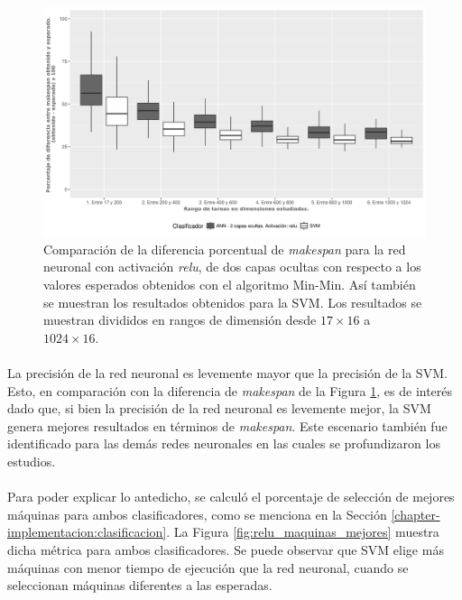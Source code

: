 \begin{figure}[H]
  \centering
  \includegraphics[width=\columnwidth]{imagenes/relu/2_medianas_diferenciasann_2_capas_ocultas_relu.png}
  \caption{Comparación de la diferencia porcentual de \textit{makespan} para la red neuronal con activación \textit{relu}, de dos capas ocultas con respecto a los valores esperados obtenidos con el algoritmo Min-Min.
Así también se muestran los resultados obtenidos para la SVM.
Los resultados se muestran divididos en rangos de dimensión desde $ 17 \times 16$ a $ 1024 \times 16$.}
  \label{fig:relu_makespan}
\end{figure}

\paragraph{}La precisión de la red neuronal es levemente mayor que la precisión de la SVM.
Esto, en comparación con la diferencia de \textit{makespan} de la Figura \ref{fig:relu_makespan}, es de interés dado que, si bien la precisión de la red neuronal es levemente mejor, la SVM genera mejores resultados en términos de \textit{makespan}.
Este escenario también fue identificado para las demás redes neuronales en las cuales se profundizaron los estudios. 

\paragraph{} Para poder explicar lo antedicho, se calculó el porcentaje de selección de mejores máquinas para ambos clasificadores, como se menciona en la Sección \ref{chapter-implementacion:clasificacion}.
La Figura \ref{fig:relu_maquinas_mejores} muestra dicha métrica para ambos clasificadores.
Se puede observar que SVM elige más máquinas con menor tiempo de ejecución que la red neuronal, cuando  se seleccionan máquinas diferentes a las esperadas. 

